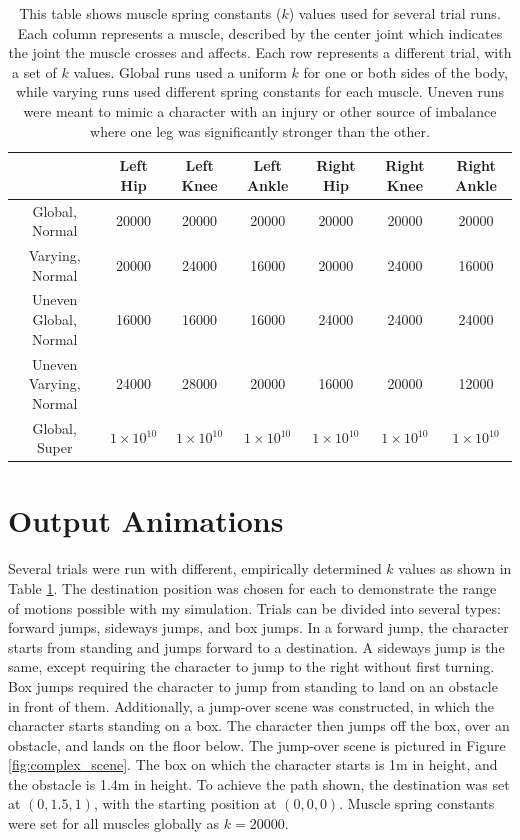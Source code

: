 \begin{table}[ht]
	\centering
	\scriptsize
	\begin{tabular}{| c | c | c | c | c | c | c |}
		\hline
		& Left Hip & Left Knee & Left Ankle & Right Hip & Right Knee & Right Ankle \\ \hline
		Global, Normal & 20000 & 20000 & 20000 & 20000 & 20000 & 20000 \\ \hline
		Varying, Normal & 20000 & 24000 & 16000 & 20000 & 24000 & 16000 \\ \hline
		Uneven Global, Normal & 16000 & 16000 & 16000 & 24000 & 24000 & 24000 \\ \hline
		Uneven Varying, Normal & 24000 & 28000 & 20000 & 16000 & 20000 & 12000 \\ \hline
		Global, Super & $1 \times 10^{10}$ & $1 \times 10^{10}$ & $1 \times 10^{10}$ & $1 \times 10^{10}$ & $1 \times 10^{10}$ & $1 \times 10^{10}$ \\ \hline
	\end{tabular}
	\caption[Table of spring constants for each trial]{This table shows muscle spring constants ($k$) values used for several trial runs.  Each column represents a muscle, described by the center joint which indicates the joint the muscle crosses and affects.  Each row represents a different trial, with a set of $k$ values.  Global runs used a uniform $k$ for one or both sides of the body, while varying runs used different spring constants for each muscle.  Uneven runs were meant to mimic a character with an injury or other source of imbalance where one leg was significantly stronger than the other.}
	\label{tab:run_k_vals}
\end{table}


\section{Output Animations}
\label{section:image_results}

Several trials were run with different, empirically determined $k$ values as shown in Table \ref{tab:run_k_vals}.  The destination position was chosen for each to demonstrate the range of motions possible with my simulation.  Trials can be divided into several types: forward jumps, sideways jumps, and box jumps.  In a forward jump, the character starts from standing and jumps forward to a destination.  A sideways jump is the same, except requiring the character to jump to the right without first turning.  Box jumps required the character to jump from standing to land on an obstacle in front of them.  Additionally, a jump-over scene was constructed, in which the character starts standing on a box.  The character then jumps off the box, over an obstacle, and lands on the floor below.  The jump-over scene is pictured in Figure \ref{fig:complex_scene}.  The box on which the character starts is 1m in height, and the obstacle is 1.4m in height.  To achieve the path shown, the destination was set at $(0, 1.5, 1)$, with the starting position at $(0, 0, 0)$.  Muscle spring constants were set for all muscles globally as $k=20000$.

